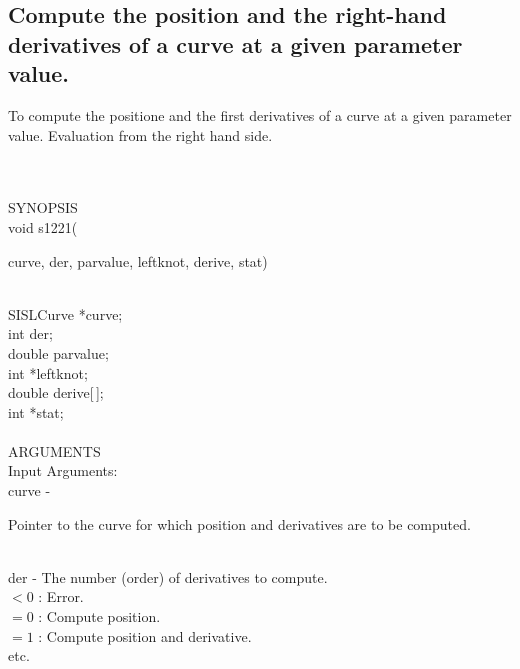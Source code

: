 \subsection{Compute the position and the right-hand derivatives of a
curve at a given parameter value.}
\begin{minipg1}
  To compute the positione and the first derivatives of a curve at
  a given parameter value.
  Evaluation from the right hand side.
\end{minipg1} \\ \\
SYNOPSIS\\
        \>void s1221(\begin{minipg3}
        {\fov curve}, {\fov der}, {\fov parvalue}, {\fov leftknot},
        {\fov derive}, {\fov stat})
                \end{minipg3}\\[0.3ex]
                \>\>    SISLCurve       \>      *{\fov curve};\\
                \>\>    int     \>      {\fov der};\\
                \>\>    double  \>      {\fov parvalue};\\
                \>\>    int     \>      *{\fov leftknot};\\
                \>\>    double  \>      {\fov derive}[\,];\\
                \>\>    int     \>      *{\fov stat};\\
\\
ARGUMENTS\\
        \>Input Arguments:\\
        \>\>    {\fov curve}    \> - \> \begin{minipg2}
                                Pointer to the curve for which position and
                                derivatives are to be computed.
                                \end{minipg2}\\[0.3ex]
        \>\>    {\fov der}      \> - \> The number (order) of derivatives to compute.\\
                \>\>\>\>\>              $< 0$   : Error.\\
                \>\>\>\>\>              $= 0$   : Compute position.\\
                \>\>\>\>\>              $= 1$   : Compute position and derivative.\\
                \>\>\>\>\>              etc.\\
